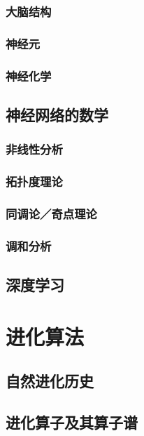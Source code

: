 \documentclass[12pt,a4paper]{report}
\newcommand{\cc}[2]{#1}
\newcommand{\cc}[2]{#2}
\theoremstyle{examples} \newtheorem{example}{Example}[section]
\begin{document}
		\subsection{\cc{大脑结构}{Brain architecture}}
		\subsection{\cc{神经元}{Neurons}}
		\subsection{\cc{神经化学}{Neuro-chemistry}}	
	
	\section{\cc{神经网络的数学}{Mathematics of neural networks}}

		\subsection{\cc{非线性分析}{Non-linear analysis}}
		\subsection{\cc{拓扑度理论}{Degree theory}}
		\subsection{\cc{同调论／奇点理论}{Homology}}
		\subsection{\cc{调和分析}{Harmonic analysis}}
	
	\section{\cc{深度学习}{Deep learning}}

\chapter{\cc{进化算法}{Evolution}}


	\section{\cc{自然进化历史}{History of natural evolution}}
	\section{\cc{进化算子及其算子谱}{Spectrum of the evolution operator}}
\end{document}
